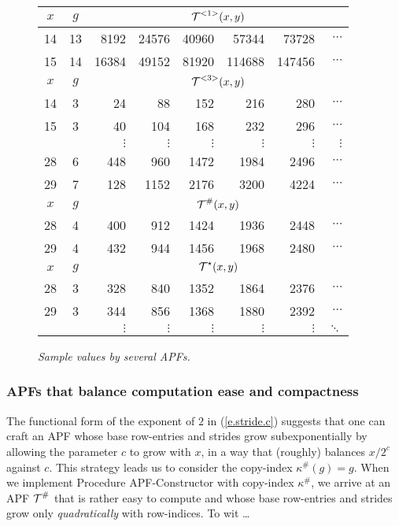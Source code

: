 \begin{figure}[htb]
\begin{center}
\begin{tabular}{c|c||r|r|r|r|r|r}
$x$ & $g$ & \multicolumn{6}{c}{$\mbox{$\cal T$}^{<1>}(x,y)$} \\
\hline
14 & 13 & 8192 & 24576 & 40960 &  57344 &  73728 &
	$\cdots$ \\
15 & 14 & 16384 & 49152 & 81920 & 114688 & 147456 &
	$\cdots$ \\
\hline
\hline
$x$ & $g$ & \multicolumn{6}{c}{$\mbox{$\cal T$}^{<3>}(x,y)$} \\
\hline
14 & 3 & 24 &   88 &  152 &  216 &  280 & $\cdots$ \\
15 & 3 & 40 &  104 &  168 &  232 &  296 & $\cdots$ \\
 & & $\vdots$ & $\vdots$ & $\vdots$ & $\vdots$ & $\vdots$ &  $\vdots$ \\
28 & 6 & 448 &  960 & 1472 & 1984 & 2496 & $\cdots$ \\
29 & 7 & 128 & 1152 & 2176 & 3200 & 4224 & $\cdots$ \\
\hline
\hline
$x$ & $g$ & \multicolumn{6}{c}{$\mbox{$\cal T$}^\#(x,y)$} \\
\hline
28 & 4 & 400 &  912 & 1424 & 1936 & 2448 & $\cdots$ \\
29 & 4 & 432 &  944 & 1456 & 1968 & 2480 & $\cdots$ \\
\hline
\hline
$x$ & $g$ & \multicolumn{6}{c}{$\mbox{$\cal T$}^\star(x,y)$} \\
\hline
28 & 3 & 328 & 840 & 1352 & 1864 & 2376 & $\cdots$ \\
29 & 3 & 344 & 856 & 1368 & 1880 & 2392 & $\cdots$ \\
   &  & $\vdots$ & $\vdots$ & $\vdots$ &
	$\vdots$ & $\vdots$ & $\ddots$ 
\end{tabular}
\end{center}
\caption{{\it Sample values by several APFs.}
\label{t.samples}}
\end{figure}

\subsubsection{APFs that balance computation ease and compactness}

The functional form of the exponent of $2$ in (\ref{e.stride.c})
suggests that one can craft an APF whose base row-entries and strides
grow subexponentially by allowing the parameter $c$ to grow with $x$,
in a way that (roughly) balances $x/2^c$ against $c$.  This strategy
leads us to consider the copy-index $\kappa^\#(g) = g$.  When we
implement Procedure {\sf APF-Constructor} with copy-index $\kappa^\#$,
we arrive at an APF $\mbox{$\cal T$}^\#$ that is rather easy to compute and whose
base row-entries and strides grow only {\em quadratically} with
row-indices.  To wit \ldots

